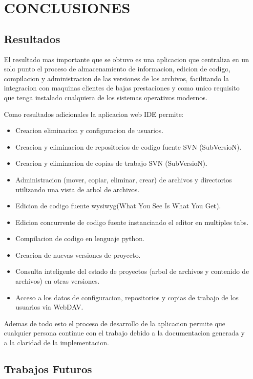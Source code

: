 \section{CONCLUSIONES}

\subsection{Resultados}

El resultado mas importante que se obtuvo es una aplicacion que centraliza en un solo punto el proceso de almacenamiento de informacion, edicion de codigo, compilacion y administracion de las versiones de los archivos, facilitando la integracion con maquinas clientes de bajas prestaciones y como unico requisito que tenga instalado cualquiera de los sistemas operativos modernos.

Como resultados adicionales la aplicacion web IDE permite:

\begin{itemize}
	\item Creacion eliminacion y configuracion de usuarios.
	\item Creacion y eliminacion de repositorios de codigo fuente SVN (SubVersioN).
	\item Creacion y eliminacion de copias de trabajo SVN (SubVersioN).
	\item Administracion (mover, copiar, eliminar, crear) de archivos y directorios utilizando una vista de arbol de archivos.
	\item Edicion de codigo fuente wysiwyg(What You See Is What You Get).
	\item Edicion concurrente de codigo fuente instanciando el editor en multiples tabs.
	\item Compilacion de codigo en lenguaje python.
	\item Creacion de nuevas versiones de proyecto.
	\item Consulta inteligente del estado de proyectos (arbol de archivos y contenido de archivos) en otras versiones.
	\item Acceso a los datos de configuracion, repositorios y copias de trabajo de los usuarios via WebDAV.
\end{itemize}

Ademas de todo esto el proceso de desarrollo de la aplicacion permite que cualquier persona continue con el trabajo debido a la documentacion generada y a la claridad de la implementacion.


\subsection{Trabajos Futuros}

